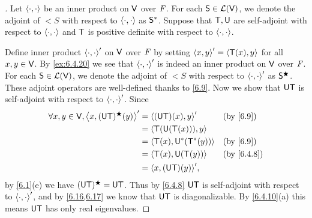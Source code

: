 \begin{proof}[]
  Let \(\left\langle\cdot, \cdot\right\rangle\) be an inner product on \(\mathsf{V}\) over \(\mathit{F}\).
  For each \(\mathsf{S} \in \mathcal{L}(\mathsf{V})\), we denote the adjoint of \(\lt{S}\) with respect to \(\left\langle\cdot, \cdot\right\rangle\) as \(\mathsf{S}^*\).
  Suppose that \(\mathsf{T}, \mathsf{U}\) are self-adjoint with respect to \(\left\langle\cdot, \cdot\right\rangle\) and \(\mathsf{T}\) is positive definite with respect to \(\left\langle\cdot, \cdot\right\rangle\).

  Define inner product \(\left\langle\cdot, \cdot\right\rangle'\) on \(\mathsf{V}\) over \(\mathit{F}\) by setting \(\left\langle x, y\right\rangle' = \left\langle\mathsf{T}(x), y\right\rangle\) for all \(x, y \in \mathsf{V}\).
  By \cref{ex:6.4.20} we see that \(\left\langle\cdot, \cdot\right\rangle'\) is indeed an inner product on \(\mathsf{V}\) over \(\mathit{F}\).
  For each \(\mathsf{S} \in \mathcal{L}(\mathsf{V})\), we denote the adjoint of \(\lt{S}\) with respect to \(\left\langle\cdot, \cdot\right\rangle'\) as \(\mathsf{S}^{\bigstar}\).
  These adjoint operators are well-defined thanks to \cref{6.9}.
  Now we show that \(\mathsf{U} \mathsf{T}\) is self-adjoint with respect to \(\left\langle\cdot, \cdot\right\rangle'\).
  Since
  \begin{align*}
    \forall x, y \in \V, \inn{x, (\U \T)^{\bigstar}(y)}' & = \inn{(\U \T)(x), y}'       &  & \by{6.9}   \\
                                                         & = \inn{\T(\U(\T(x))), y}                     \\
                                                         & = \inn{\T(x), \U^*(\T^*(y))} &  & \by{6.9}   \\
                                                         & = \inn{\T(x), \U(\T(y))}     &  & \by{6.4.8} \\
                                                         & = \inn{x, (\U \T)(y)}',
  \end{align*}
  by \cref{6.1}(e) we have \((\mathsf{U} \mathsf{T})^{\bigstar} = \mathsf{U} \mathsf{T}\).
  Thus by \cref{6.4.8} \(\mathsf{U} \mathsf{T}\) is self-adjoint with respect to \(\left\langle\cdot, \cdot\right\rangle'\), and by \cref{6.16,6.17} we know that \(\mathsf{U} \mathsf{T}\) is diagonalizable.
  By \cref{6.4.10}(a) this means \(\mathsf{U} \mathsf{T}\) has only real eigenvalues.


\end{proof}
